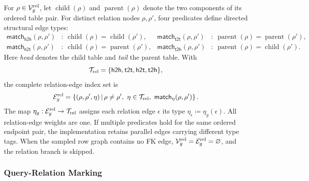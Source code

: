 For \(\rho\in\mathcal V_g^{\mathrm{rel}}\), let
\(\operatorname{child}(\rho)\) and \(\operatorname{parent}(\rho)\) denote
the two components of its ordered table pair. For distinct relation nodes
\(\rho,\rho'\), four predicates define directed structural edge types:
\begin{equation}
\begin{aligned}
  \mathsf{match}_{\mathsf{h2h}}(\rho,\rho')
  &:\ \operatorname{child}(\rho)=\operatorname{child}(\rho'),
  &
  \mathsf{match}_{\mathsf{t2t}}(\rho,\rho')
  &:\ \operatorname{parent}(\rho)=\operatorname{parent}(\rho'),\\
  \mathsf{match}_{\mathsf{h2t}}(\rho,\rho')
  &:\ \operatorname{child}(\rho)=\operatorname{parent}(\rho'),
  &
  \mathsf{match}_{\mathsf{t2h}}(\rho,\rho')
  &:\ \operatorname{parent}(\rho)=\operatorname{child}(\rho').
\end{aligned}
\label{eq:method:relation-predicates}
\end{equation}
Here \emph{head} denotes the child table and \emph{tail} the parent table.
With
\begin{equation}
  \mathcal T_{\mathrm{rel}}
  =
  \{\mathsf{h2h},\mathsf{t2t},\mathsf{h2t},\mathsf{t2h}\},
\label{eq:method:relation-edge-types}
\end{equation}
the complete relation-edge index set is
\begin{equation}
  \mathcal E_g^{\graphrel}
  =
  \left\{
    (\rho,\rho',\eta)
    \,\middle|\,
    \rho\ne\rho',\ 
    \eta\in\mathcal T_{\graphrel},\ 
    \mathsf{match}_\eta(\rho,\rho')
  \right\}.
\label{eq:method:relation-edge-set}
\end{equation}
The map
\(\eta_g:\mathcal E_g^{\mathrm{rel}}\to\mathcal T_{\mathrm{rel}}\) assigns
each relation edge \(\epsilon\) its type
\(\eta_\epsilon\coloneqq\eta_g(\epsilon)\). All relation-edge weights are
one. If multiple predicates hold for the same ordered endpoint pair, the
implementation retains parallel edges carrying different type tags.
When the sampled row graph contains no FK edge,
\(\mathcal V_g^{\mathrm{rel}}=\mathcal E_g^{\mathrm{rel}}=\varnothing\), and the
relation branch is skipped.

\subsubsection{Query-Relation Marking}
\label{sec:method:query-relation-marking}

